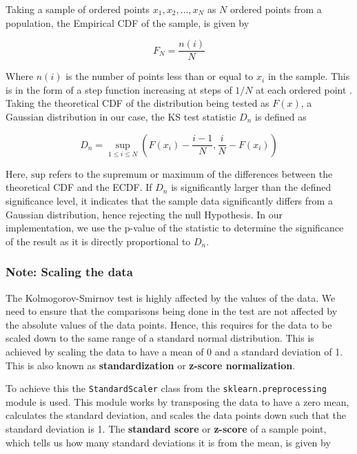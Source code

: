 \documentclass[12pt]{article}
\begin{document}
\medskip
\noindent  Taking a sample of ordered points $x_1, x_2, \ldots, x_N$ as $N$ ordered points from a population, the Empirical CDF of the sample, is given by

\begin{equation}
    F_N = \frac{n(i)}{N}
    \label{eq:edf}
\end{equation}

\medskip
\noindent Where $n(i)$ is the number of points less than or equal to $x_i$ in the sample. This is in the form of a step function increasing at steps of $1/N$ at each ordered point \cite{guthrie_nistsematech_2020}. Taking the theoretical CDF of the distribution being tested as $F(x)$, a Gaussian distribution in our case, the KS test statistic $D_n$ is defined as

\begin{equation}
    D_n = \sup_{1 \leq i \leq N} \left( F(x_i) - \frac{i - 1}{N} , \frac{i}{N} - F(x_i) \right)
    \label{eq:ks_statistic}
\end{equation}

\medskip
\noindent Here,  $\text{sup}$ refers to the supremum or maximum of the differences between the theoretical CDF and the ECDF. If $D_n$ is significantly larger than the defined significance level, it indicates that the sample data significantly differs from a Gaussian distribution, hence rejecting the null Hypothesis. In our implementation, we use the p-value of the statistic to determine the significance of the result as it is directly proportional to $D_n$.

\subsubsection{Note: Scaling the data}\label{Scaling}

\noindent The Kolmogorov-Smirnov test is highly affected by the values of the data. We need to ensure that the comparisons being done in the test are not affected by the absolute values of the data points. Hence, this requires for the data to be scaled down to the same range of a standard normal distribution. This is achieved by scaling the data to have a mean of 0 and a standard deviation of 1. This is also known as \textbf{standardization} or \textbf{z-score normalization}.

\medskip
\noindent To achieve this the \texttt{StandardScaler} class from the \texttt{sklearn.preprocessing} module is used. This module works by transposing the data to have a zero mean, calculates the standard deviation, and scales the data points down such that the standard deviation is 1. The \textbf{standard score} or \textbf{z-score} of a sample point, which tells us how many standard deviations it is from the mean, is given by
\end{document}
